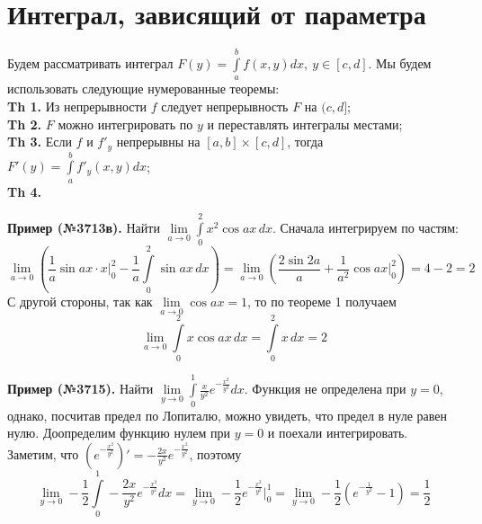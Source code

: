 \section{Интеграл, зависящий от параметра}
Будем рассматривать интеграл $F(y)=\int\limits_{a}^{b}f(x,y)dx,~y\in [c,d]$.
Мы будем использовать следующие нумерованные теоремы:\\
\textbf{Th 1.} Из непрерывности $f$ следует непрерывность  $F$ на $(c,d]$;\\
\textbf{Th 2.} $F$ можно интегрировать по $y$ и переставлять интегралы 
местами;\\
\textbf{Th 3.} Если $f$ и $f'_y$ непрерывны на  $[a,b]\times[c,d]$, тогда 
$F'(y)=\int\limits_{a}^{b}f'_y(x,y)dx$;\\
\textbf{Th 4.} 

\textbf{Пример (№3713в).} Найти $\lim\limits_{a \to 0}\int\limits_{0}^{2}
x^2\cos ax \,dx$. Сначала интегрируем по частям: 
$$\lim\limits_{a \to 0} \left(\frac{1}{a}\sin ax\cdot x\Big|_0^2-\frac{1}{a}
    \int\limits_{0}^{2}\sin ax\,dx\right)=\lim\limits_{a \to 0} 
\left( \frac{2\sin 2a}{a}+\frac{1}{a^2}\cos ax\Big|^2_0 \right) = 4-2=2$$
С другой стороны, так как $\lim\limits_{a \to 0} \cos ax=1$, то по 
теореме 1 получаем
$$\lim\limits_{a \to 0}\int\limits_{0}^{2} x\cos ax\,dx=\int\limits_{0}^{2}
x\,dx=2$$

\textbf{Пример (№3715).} Найти $\lim\limits_{y \to 0}\int\limits_{0}^{1} 
\frac{x}{y^2}e^{-\frac{x^2}{y^2}}dx$. Функция не определена при $y=0$, 
однако, посчитав предел по Лопиталю, можно увидеть, что предел в нуле равен
нулю. Доопределим функцию нулем при $y=0$ и поехали интегрировать. Заметим, 
что  $(e^{-\frac{x^2}{y^2}})'=-\frac{2x}{y^2}e^{-\frac{x^2}{y^2}}$, поэтому
$$\lim\limits_{y \to 0}-\frac{1}{2}\int\limits_{0}^{1} 
-\frac{2x}{y^2}e^{-\frac{x^2}{y^2}}dx= \lim\limits_{y \to 0} -\frac{1}{2}
e^{-\frac{x^2}{y^2}}\Big|_0^1=\lim\limits_{y \to 0}-\frac{1}{2}\left( 
e^{-\frac{1}{y^2}}-1\right) =\frac{1}{2}$$

